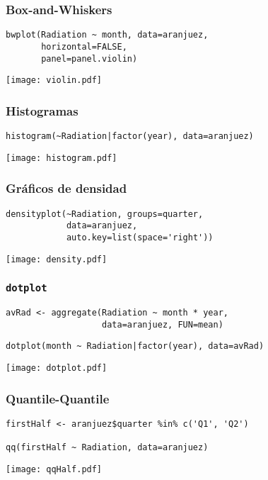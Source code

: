\documentclass[xcolor={usenames,svgnames,dvipsnames}]{beamer}
\begin{document}
\begin{frame}[fragile]
\frametitle{Box-and-Whiskers}
\label{sec-2-1-20}


\lstset{language=R}
\begin{lstlisting}
bwplot(Radiation ~ month, data=aranjuez,
       horizontal=FALSE,
       panel=panel.violin)
\end{lstlisting}

\texttt{[image: violin.pdf]}

    
\end{frame}
\begin{frame}[fragile]
\frametitle{Histogramas}
\label{sec-2-1-21}


\lstset{language=R}
\begin{lstlisting}
histogram(~Radiation|factor(year), data=aranjuez)
\end{lstlisting}

\texttt{[image: histogram.pdf]}
\end{frame}
\begin{frame}[fragile]
\frametitle{Gráficos de densidad}
\label{sec-2-1-22}


\lstset{language=R}
\begin{lstlisting}
densityplot(~Radiation, groups=quarter,
            data=aranjuez,
            auto.key=list(space='right'))
\end{lstlisting}

\texttt{[image: density.pdf]}
\end{frame}
\begin{frame}[fragile]
\frametitle{\texttt{dotplot}}
\label{sec-2-1-23}


\lstset{language=R}
\begin{lstlisting}
avRad <- aggregate(Radiation ~ month * year,
                   data=aranjuez, FUN=mean)
\end{lstlisting}



\lstset{language=R}
\begin{lstlisting}
dotplot(month ~ Radiation|factor(year), data=avRad)
\end{lstlisting}

\texttt{[image: dotplot.pdf]}
\end{frame}
\begin{frame}[fragile]
\frametitle{Quantile-Quantile}
\label{sec-2-1-24}


\lstset{language=R}
\begin{lstlisting}
firstHalf <- aranjuez$quarter %in% c('Q1', 'Q2')

qq(firstHalf ~ Radiation, data=aranjuez)
\end{lstlisting}

\texttt{[image: qqHalf.pdf]}
\end{frame}
\end{document}
